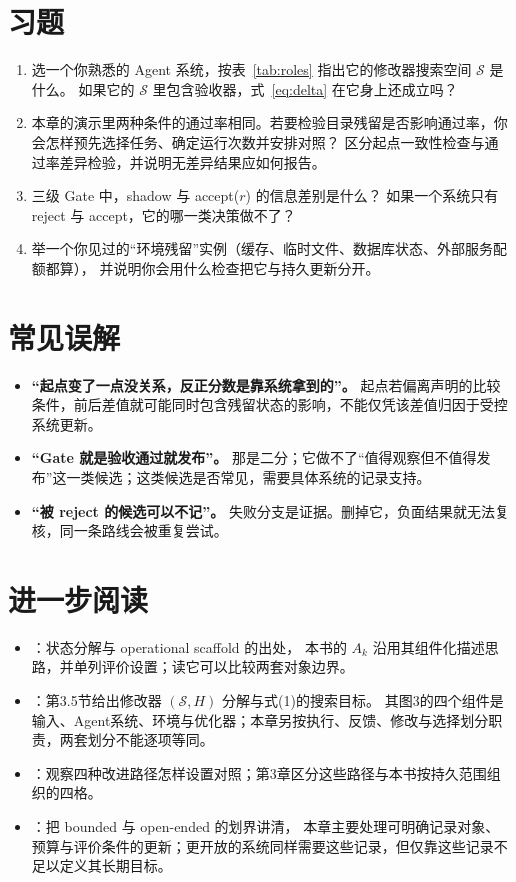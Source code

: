 \section*{习题}
\begin{enumerate}[label=2-\arabic*.,ref=2-\arabic*]
  \item\label{ex:ch02-1} 选一个你熟悉的 Agent 系统，按表~\ref{tab:roles} 指出它的修改器搜索空间 $\mathcal S$ 是什么。
        如果它的 $\mathcal S$ 里包含验收器，式~\eqref{eq:delta} 在它身上还成立吗？
  \item\label{ex:ch02-2} 本章的演示里两种条件的通过率相同。若要检验目录残留是否影响通过率，你会怎样预先选择任务、确定运行次数并安排对照？
        区分起点一致性检查与通过率差异检验，并说明无差异结果应如何报告。
  \item\label{ex:ch02-3} 三级 Gate 中，shadow 与 accept($r$) 的信息差别是什么？
        如果一个系统只有 reject 与 accept，它的哪一类决策做不了？
  \item\label{ex:ch02-4} 举一个你见过的“环境残留”实例（缓存、临时文件、数据库状态、外部服务配额都算），
        并说明你会用什么检查把它与持久更新分开。
\end{enumerate}

\section*{常见误解}
\begin{itemize}
  \item \textbf{“起点变了一点没关系，反正分数是靠系统拿到的”。}
        起点若偏离声明的比较条件，前后差值就可能同时包含残留状态的影响，不能仅凭该差值归因于受控系统更新。
  \item \textbf{“Gate 就是验收通过就发布”。}
        那是二分；它做不了“值得观察但不值得发布”这一类候选；这类候选是否常见，需要具体系统的记录支持。
  \item \textbf{“被 reject 的候选可以不记”。}
        失败分支是证据。删掉它，负面结果就无法复核，同一条路线会被重复尝试。
\end{itemize}

\section*{进一步阅读}
\begin{itemize}
  \item \cite{self-improvements-survey-2607}：状态分解与 operational scaffold 的出处，
        本书的 $A_k$ 沿用其组件化描述思路，并单列评价设置；读它可以比较两套对象边界。
  \item \cite{self-evolving-comprehensive-2508}：第3.5节给出修改器 $(\mathcal S,H)$ 分解与式(1)的搜索目标。
        其图3的四个组件是输入、Agent系统、环境与优化器；本章另按执行、反馈、修改与选择划分职责，两套划分不能逐项等同。
  \item \cite{harness-eval-2607}：观察四种改进路径怎样设置对照；第3章区分这些路径与本书按持久范围组织的四格。
  \item \cite{rsi-survey-2607}：把 bounded 与 open-ended 的划界讲清，
        本章主要处理可明确记录对象、预算与评价条件的更新；更开放的系统同样需要这些记录，但仅靠这些记录不足以定义其长期目标。
\end{itemize}
